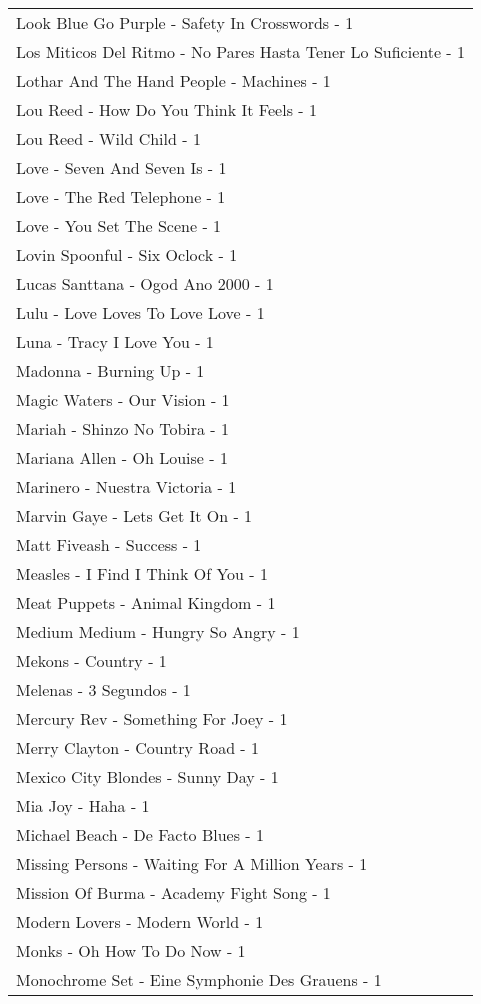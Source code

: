 \documentclass[
]{article}
\begin{document}
\begin{longtable}{l}
Look Blue Go Purple - Safety In Crosswords - 1 \\ 
Los Miticos Del Ritmo - No Pares Hasta Tener Lo Suficiente - 1 \\ 
Lothar And The Hand People - Machines - 1 \\ 
Lou Reed - How Do You Think It Feels - 1 \\ 
Lou Reed - Wild Child - 1 \\ 
Love - Seven And Seven Is - 1 \\ 
Love - The Red Telephone - 1 \\ 
Love - You Set The Scene - 1 \\ 
Lovin Spoonful - Six Oclock - 1 \\ 
Lucas Santtana - Ogod Ano 2000 - 1 \\ 
Lulu - Love Loves To Love Love - 1 \\ 
Luna - Tracy I Love You - 1 \\ 
Madonna - Burning Up - 1 \\ 
Magic Waters - Our Vision - 1 \\ 
Mariah - Shinzo No Tobira - 1 \\ 
Mariana Allen - Oh Louise - 1 \\ 
Marinero - Nuestra Victoria - 1 \\ 
Marvin Gaye - Lets Get It On - 1 \\ 
Matt Fiveash - Success - 1 \\ 
Measles - I Find I Think Of You - 1 \\ 
Meat Puppets - Animal Kingdom - 1 \\ 
Medium Medium - Hungry So Angry - 1 \\ 
Mekons - Country - 1 \\ 
Melenas - 3 Segundos - 1 \\ 
Mercury Rev - Something For Joey - 1 \\ 
Merry Clayton - Country Road - 1 \\ 
Mexico City Blondes - Sunny Day - 1 \\ 
Mia Joy - Haha - 1 \\ 
Michael Beach - De Facto Blues - 1 \\ 
Missing Persons - Waiting For A Million Years - 1 \\ 
Mission Of Burma - Academy Fight Song - 1 \\ 
Modern Lovers - Modern World - 1 \\ 
Monks - Oh How To Do Now - 1 \\ 
Monochrome Set - Eine Symphonie Des Grauens - 1 \\ 

\end{longtable}
\end{document}

